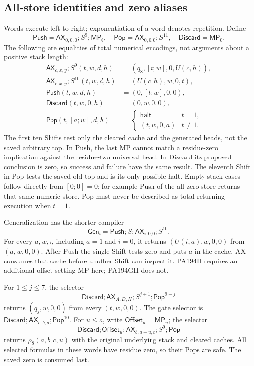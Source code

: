 \subsection{All-store identities and zero aliases}

Words execute left to right; exponentiation of a word denotes repetition.
Define
\[
 \mathsf{Push}=\mathsf{AX}_{0,0,0};S^9;\mathsf{MP}_0,
 \quad \mathsf{Pop}=\mathsf{AX}_{0,0,0};S^{11},
 \quad \mathsf{Discard}=\mathsf{MP}_0.
\]
The following are equalities of total numerical encodings, not arguments
about a positive stack length:
\begin{align*}
 \mathsf{AX}_{c,x,y};S^9(t,w,d,h)&=(q_8,[t;w],0,U(c,h)),\\
 \mathsf{AX}_{c,x,y};S^{10}(t,w,d,h)&=(U(c,h),w,0,t),\\
 \mathsf{Push}(t,w,d,h)&=(0,[t;w],0,0),\\
 \mathsf{Discard}(t,w,0,h)&=(0,w,0,0),\\
 \mathsf{Pop}(t,[a;w],d,h)&=
 \begin{cases}\mathsf{halt}&t=1,\\(t,w,0,a)&t\ne1.\end{cases}
\end{align*}
The first ten Shifts test only the cleared cache and the generated heads,
not the saved arbitrary top. In Push, the last MP cannot match a
residue-zero implication against the residue-two universal head. In
Discard its proposed conclusion is zero, so success and failure have the
same result. The eleventh Shift in Pop tests the saved old top and is its
only possible halt. Empty-stack cases follow directly from $[0;0]=0$;
for example Push of the all-zero store returns that same numeric store.
Pop must never be described as total returning execution when $t=1$.

Generalization has the shorter compiler
\[
 \mathsf{Gen}_i=\mathsf{Push};S;\mathsf{AX}_{i,0,0};S^{10}.
\]
For every $a,w,i$, including $a=1$ and $i=0$, it returns
$(U(i,a),w,0,0)$ from $(a,w,0,0)$. After Push the single Shift tests zero
and puts $a$ in the cache. AX consumes that cache before another Shift
can inspect it. PA194H requires an additional offset-setting MP here;
PA194GH does not.

For $1\le j\le7$, the selector
\[
 \mathsf{Discard};\mathsf{AX}_{A,D,H};S^{j+1};\mathsf{Pop}^{9-j}
\]
returns $(q_j,w,0,0)$ from every $(t,w,0,0)$. The gate selector is
$\mathsf{Discard};\mathsf{AX}_{c,b,a};\mathsf{Pop}^{10}$.
For $u\le a$, write $\mathsf{Offset}_u=\mathsf{MP}_u$; the selector
\[
 \mathsf{Discard};\mathsf{Offset}_u;
 \mathsf{AX}_{b,a-u,c};S^9;\mathsf{Pop}
\]
returns $\rho_8(a,b,c,u)$ with the original underlying stack and cleared
caches. All selected formulas in these words have residue zero, so their
Pops are safe. The saved zero is consumed last.

